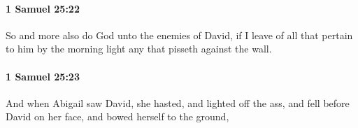 		\paragraph{1 Samuel 25:22} %
			\label{1SAMUEL-25-22}

			So and more also do God unto the enemies of David, if I leave of all that pertain to him by the morning light any that pisseth against the wall.


		\paragraph{1 Samuel 25:23} %
			\label{1SAMUEL-25-23}

			And when Abigail saw David, she hasted, and lighted off the ass, and fell before David on her face, and bowed herself to the ground,


